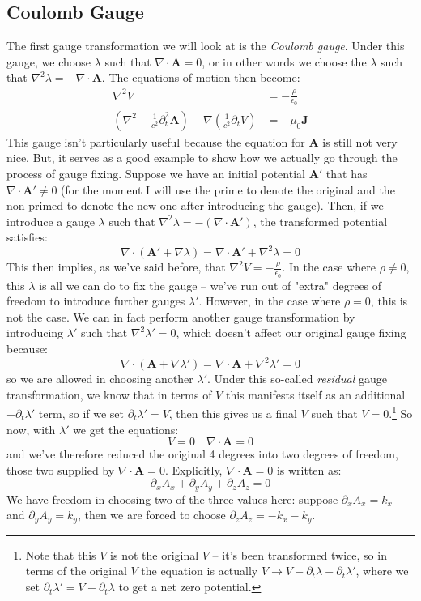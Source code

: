 \subsection{Coulomb Gauge}
The first gauge transformation we will look at is the \textit{Coulomb gauge}. Under this gauge, we choose \(
\lambda\) such that \( \nabla \cdot \mathbf{A} = 0 \), or in other words we choose the \( \lambda \) such
that \( \nabla^2 \lambda = - \nabla \cdot \mathbf{A} \). The equations of motion then become:
\begin{align*}
	\nabla^2 V &= -\frac{\rho}{\epsilon_0}\\
	(\nabla^2 - \frac{1}{c^2}\partial_t^2 \mathbf{A}) - \nabla\left( \frac{1}{c^2} \partial_t V \right) &=
	-\mu_0 \mathbf{J}
\end{align*}
This gauge isn't particularly useful because the equation for \( \mathbf{A} \) is still not very nice. But,
it serves as a good example to show how we actually go through the process of gauge fixing. Suppose we have
an initial potential \( \mathbf{A}' \) that has \( \nabla \cdot \mathbf{A}' \neq 0\) (for the moment I will
use the prime to denote the original and the non-primed to denote the new one after introducing the gauge).
Then, if we introduce a gauge \( \lambda \) such that \( \nabla^2 \lambda = -(\nabla \cdot \mathbf{A}') \),
the transformed potential satisfies: 
\[
	\nabla \cdot (\mathbf{A}' + \nabla \lambda) = \nabla \cdot \mathbf{A}' + \nabla^2 \lambda = 0
\]
This then implies, as we've said before, that \( \nabla^2 V = -\frac{\rho}{\epsilon_0} \). In the case where
\( \rho \neq 0 \), this \( \lambda \) is all we can do to fix the gauge -- we've run out of "extra" degrees
of freedom to introduce further gauges \( \lambda' \). However, in the case where \( \rho = 0 \), this is not
the case. We can in fact perform another gauge transformation by introducing \( \lambda' \) such that \(
\nabla^2 \lambda' = 0 \), which doesn't affect our original gauge fixing because:
\[
	\nabla \cdot (\mathbf{A} + \nabla \lambda') = \nabla \cdot \mathbf{A} + \nabla^2 \lambda' = 0
\]
so we are allowed in choosing another \( \lambda' \). Under this so-called \textit{residual} gauge
transformation, we know that
in terms of \( V \) this manifests itself as an additional \( -\partial_t \lambda' \) term, so if we set \(
\partial_t \lambda' = V \), then this gives us a final \( V \) such that \( V = 0 \).\footnote{Note that this
	\( V \) is not the original \( V \) -- it's been transformed twice, so in terms of the original \( V \)
	the equation is actually \( V \to V - \partial_t \lambda - \partial_t \lambda' \), where we set \(
\partial_t \lambda' = V - \partial_t \lambda \) to get a net zero potential.}
So now, with \( \lambda' \) we get the equations:
\[
	V = 0 \quad \nabla \cdot \mathbf{A} = 0
\]
and we've therefore reduced the original 4 degrees into two degrees of freedom, those two supplied by \(
\nabla \cdot \mathbf{A} = 0 \). Explicitly, \( \nabla \cdot \mathbf{A} = 0  \) is written as:
\[
	\partial_x A_x + \partial_y A_y + \partial_z A_z = 0
\]
We have freedom in choosing two of the three values here: suppose \( \partial_x A_x = k_x \) and \(
\partial_y A_y = k_y \), then we are forced to choose \( \partial_z A_z = -k_x - k_y\).  
 



